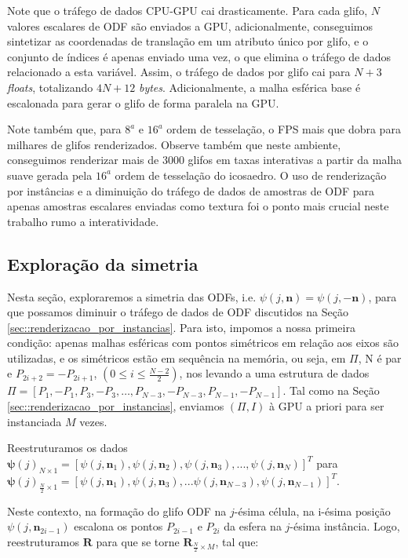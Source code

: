 \documentclass[
    12pt,                %
    oneside,            %
    a4paper,            %
    english,            %
    french,                %
    spanish,            %
    brazil                %
    ]{abntex2}
\begin{document}
Note que o tráfego de dados CPU-GPU cai drasticamente. Para cada glifo, $N$ valores escalares de ODF são enviados a GPU, adicionalmente, conseguimos sintetizar as coordenadas de translação em um atributo único por glifo, e o conjunto de índices é apenas enviado uma vez, o que elimina o tráfego de dados relacionado a esta variável. Assim, o tráfego de dados por glifo cai para $N + 3$ \textit{floats}, totalizando $4N + 12$ \textit{bytes}. Adicionalmente, a malha esférica base é escalonada para gerar o glifo de forma paralela na GPU.

Note também que, para $8^a$ e $16^a$ ordem de tesselação, o FPS mais que dobra para milhares de glifos renderizados. Observe também que neste ambiente, conseguimos renderizar mais de 3000 glifos em taxas interativas \cite{nielsen1994} a partir da malha suave gerada pela $16^a$ ordem de tesselação do icosaedro. O uso de renderização por instâncias e a diminuição do tráfego de dados de amostras de ODF para apenas amostras escalares enviadas como textura foi o ponto mais crucial neste trabalho rumo a interatividade.

\subsection{Exploração da simetria}
\label{sec::otimizacao_da_simetria}

Nesta seção, exploraremos a simetria das ODFs, i.e. $\psi(j, \mathbf{n}) = \psi(j, -\mathbf{n})$, para que possamos diminuir o tráfego de dados de ODF discutidos na Seção \ref{sec::renderizacao_por_instancias}. Para isto, impomos a nossa primeira condição: apenas malhas esféricas com pontos simétricos em relação aos eixos são utilizadas, e os simétricos estão em sequência na memória, ou seja, em $\Pi$, N é par e $P_{2i+2} = -P_{2i+1}$, $(0 \leq i \leq \frac{N-2}{2})$, nos levando a uma estrutura de dados $\Pi = [P_1, -P_1, P_3, -P_3, \dots, P_{N-3}, -P_{N-3}, P_{N-1}, -P_{N-1}]$. Tal como na Seção \ref{sec::renderizacao_por_instancias}, enviamos $(\Pi, I)$ à GPU a priori para ser instanciada $M$ vezes.

Reestruturamos os dados
$\boldsymbol{\psi}(j)_{N\times 1} = [
\psi(j, \mathbf{n}_1), 
\psi(j, \mathbf{n}_2), 
\psi(j, \mathbf{n}_3), ..., 
\psi(j, \mathbf{n}_N)
]^T$ para
$\boldsymbol{\psi}(j)_{\frac{N}{2}\times 1} =[
\psi(j, \mathbf{n}_1), 
\psi(j, \mathbf{n}_3), ...
\psi(j, \mathbf{n}_{N-3}),
\psi(j, \mathbf{n}_{N-1})
]^T$.

Neste contexto, na formação do glifo ODF na $j$-ésima célula, na i-ésima posição $\psi(j, \mathbf{n}_{2i-1})$ escalona os pontos $P_{2i-1}$ e $P_{2i}$ da esfera na $j$-ésima instância. Logo, reestruturamos $\mathbf{R}$ para que se torne $\mathbf{R}_{\frac{N}{2}\times M}$, tal que:
\end{document}
